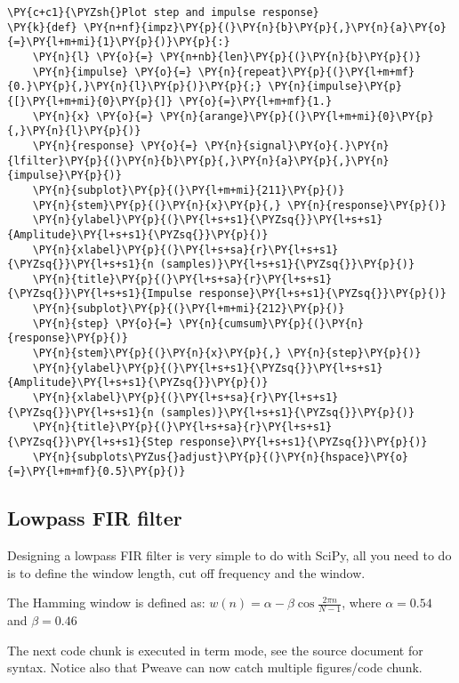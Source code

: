 \documentclass[a4paper,11pt,final]{article}
\begin{document}
\begin{Verbatim}[commandchars=\\\{\},frame=single,fontsize=\small, xleftmargin=0.5em]
\PY{c+c1}{\PYZsh{}Plot step and impulse response}
\PY{k}{def} \PY{n+nf}{impz}\PY{p}{(}\PY{n}{b}\PY{p}{,}\PY{n}{a}\PY{o}{=}\PY{l+m+mi}{1}\PY{p}{)}\PY{p}{:}
    \PY{n}{l} \PY{o}{=} \PY{n+nb}{len}\PY{p}{(}\PY{n}{b}\PY{p}{)}
    \PY{n}{impulse} \PY{o}{=} \PY{n}{repeat}\PY{p}{(}\PY{l+m+mf}{0.}\PY{p}{,}\PY{n}{l}\PY{p}{)}\PY{p}{;} \PY{n}{impulse}\PY{p}{[}\PY{l+m+mi}{0}\PY{p}{]} \PY{o}{=}\PY{l+m+mf}{1.}
    \PY{n}{x} \PY{o}{=} \PY{n}{arange}\PY{p}{(}\PY{l+m+mi}{0}\PY{p}{,}\PY{n}{l}\PY{p}{)}
    \PY{n}{response} \PY{o}{=} \PY{n}{signal}\PY{o}{.}\PY{n}{lfilter}\PY{p}{(}\PY{n}{b}\PY{p}{,}\PY{n}{a}\PY{p}{,}\PY{n}{impulse}\PY{p}{)}
    \PY{n}{subplot}\PY{p}{(}\PY{l+m+mi}{211}\PY{p}{)}
    \PY{n}{stem}\PY{p}{(}\PY{n}{x}\PY{p}{,} \PY{n}{response}\PY{p}{)}
    \PY{n}{ylabel}\PY{p}{(}\PY{l+s+s1}{\PYZsq{}}\PY{l+s+s1}{Amplitude}\PY{l+s+s1}{\PYZsq{}}\PY{p}{)}
    \PY{n}{xlabel}\PY{p}{(}\PY{l+s+sa}{r}\PY{l+s+s1}{\PYZsq{}}\PY{l+s+s1}{n (samples)}\PY{l+s+s1}{\PYZsq{}}\PY{p}{)}
    \PY{n}{title}\PY{p}{(}\PY{l+s+sa}{r}\PY{l+s+s1}{\PYZsq{}}\PY{l+s+s1}{Impulse response}\PY{l+s+s1}{\PYZsq{}}\PY{p}{)}
    \PY{n}{subplot}\PY{p}{(}\PY{l+m+mi}{212}\PY{p}{)}
    \PY{n}{step} \PY{o}{=} \PY{n}{cumsum}\PY{p}{(}\PY{n}{response}\PY{p}{)}
    \PY{n}{stem}\PY{p}{(}\PY{n}{x}\PY{p}{,} \PY{n}{step}\PY{p}{)}
    \PY{n}{ylabel}\PY{p}{(}\PY{l+s+s1}{\PYZsq{}}\PY{l+s+s1}{Amplitude}\PY{l+s+s1}{\PYZsq{}}\PY{p}{)}
    \PY{n}{xlabel}\PY{p}{(}\PY{l+s+sa}{r}\PY{l+s+s1}{\PYZsq{}}\PY{l+s+s1}{n (samples)}\PY{l+s+s1}{\PYZsq{}}\PY{p}{)}
    \PY{n}{title}\PY{p}{(}\PY{l+s+sa}{r}\PY{l+s+s1}{\PYZsq{}}\PY{l+s+s1}{Step response}\PY{l+s+s1}{\PYZsq{}}\PY{p}{)}
    \PY{n}{subplots\PYZus{}adjust}\PY{p}{(}\PY{n}{hspace}\PY{o}{=}\PY{l+m+mf}{0.5}\PY{p}{)}
\end{Verbatim}


\subsection{Lowpass FIR filter}

Designing a lowpass FIR filter is very simple to do with SciPy, all you
need to do is to define the window length, cut off frequency and the
window.

The Hamming window is defined as:
$w(n) = \alpha - \beta\cos\frac{2\pi n}{N-1}$, where $\alpha=0.54$ and
$\beta=0.46$

The next code chunk is executed in term mode, see the source document
for syntax. Notice also that Pweave can now catch multiple
figures/code chunk.
\end{document}
